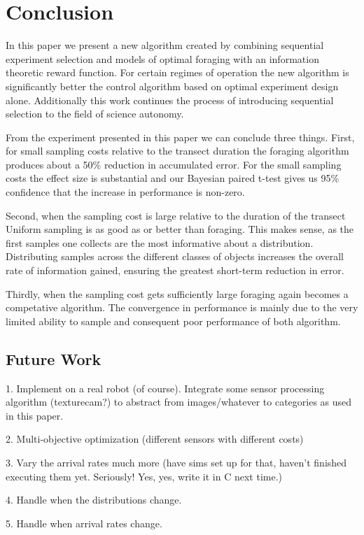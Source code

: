 \section{Conclusion}
\label{sec:conclusion}

In this paper we present a new algorithm created by combining sequential experiment selection and models of optimal foraging with an information theoretic reward function.  For certain regimes of operation the new algorithm is significantly better the control algorithm based on optimal experiment design alone.  Additionally this work continues the process of introducing sequential selection to the field of science autonomy.  

From the experiment presented in this paper we can conclude three things.  First, for small sampling costs relative to the transect duration the foraging algorithm produces about a 50\% reduction in accumulated error.  For the small sampling costs the effect size is substantial and our Bayesian paired t-test gives us 95\% confidence that the increase in performance is non-zero.

Second, when the sampling cost is large relative to the duration of the transect Uniform sampling is as good as or better than foraging.  This makes sense, as the first samples one collects are the most informative about a distribution.  Distributing samples across the different classes of objects increases the overall rate of information gained, ensuring the greatest short-term reduction in error.

Thirdly, when the sampling cost gets sufficiently large foraging again becomes a competative algorithm.  The convergence in performance is mainly due to the very limited ability to sample and consequent poor performance of both algorithm.  


\subsection{Future Work}

1. Implement on a real robot (of course).  Integrate some sensor processing algorithm (texturecam?) to abstract from images/whatever to categories as used in this paper.

2. Multi-objective optimization (different sensors with different costs)

3. Vary the arrival rates much more (have sims set up for that, haven't finished executing them yet.  Seriously! Yes, yes, write it in C next time.)

4. Handle when the distributions change. 

5. Handle when arrival rates change.




